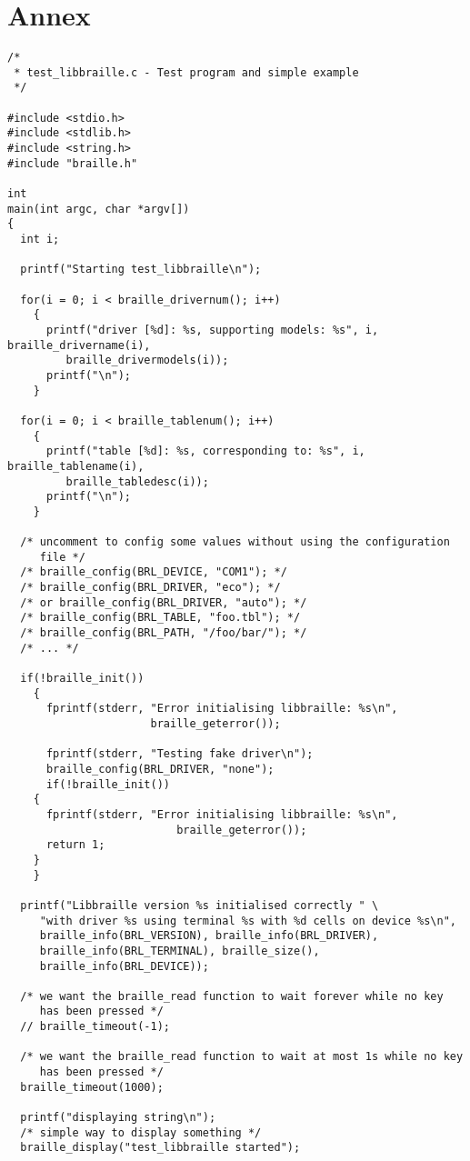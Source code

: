 \documentclass[12pt,a4paper]{article}
\begin{document}
\section*{Annex}
\begin{verbatim}
/*
 * test_libbraille.c - Test program and simple example
 */

#include <stdio.h>
#include <stdlib.h>
#include <string.h>
#include "braille.h"

int 
main(int argc, char *argv[])
{
  int i;

  printf("Starting test_libbraille\n");

  for(i = 0; i < braille_drivernum(); i++)
    {
      printf("driver [%d]: %s, supporting models: %s", i, braille_drivername(i),
	     braille_drivermodels(i));
      printf("\n");
    }

  for(i = 0; i < braille_tablenum(); i++)
    {
      printf("table [%d]: %s, corresponding to: %s", i, braille_tablename(i),
	     braille_tabledesc(i));
      printf("\n");
    }

  /* uncomment to config some values without using the configuration
     file */
  /* braille_config(BRL_DEVICE, "COM1"); */
  /* braille_config(BRL_DRIVER, "eco"); */
  /* or braille_config(BRL_DRIVER, "auto"); */
  /* braille_config(BRL_TABLE, "foo.tbl"); */
  /* braille_config(BRL_PATH, "/foo/bar/"); */
  /* ... */

  if(!braille_init())
    {
      fprintf(stderr, "Error initialising libbraille: %s\n",
                      braille_geterror());
      
      fprintf(stderr, "Testing fake driver\n");
      braille_config(BRL_DRIVER, "none");
      if(!braille_init())
	{
	  fprintf(stderr, "Error initialising libbraille: %s\n",
                          braille_geterror());
	  return 1;
	}
    }

  printf("Libbraille version %s initialised correctly " \
	 "with driver %s using terminal %s with %d cells on device %s\n",
	 braille_info(BRL_VERSION), braille_info(BRL_DRIVER),
	 braille_info(BRL_TERMINAL), braille_size(),
	 braille_info(BRL_DEVICE));

  /* we want the braille_read function to wait forever while no key
     has been pressed */
  // braille_timeout(-1);

  /* we want the braille_read function to wait at most 1s while no key
     has been pressed */
  braille_timeout(1000);

  printf("displaying string\n");
  /* simple way to display something */
  braille_display("test_libbraille started");


\end{verbatim}
\end{document}
